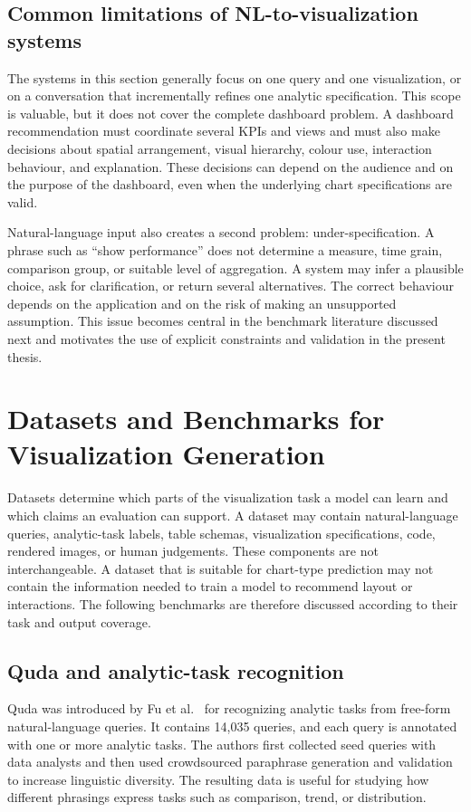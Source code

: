 \subsection{Common limitations of NL-to-visualization systems}

The systems in this section generally focus on one query and one visualization, or on a conversation that incrementally refines one analytic specification. This scope is valuable, but it does not cover the complete dashboard problem. A dashboard recommendation must coordinate several KPIs and views and must also make decisions about spatial arrangement, visual hierarchy, colour use, interaction behaviour, and explanation. These decisions can depend on the audience and on the purpose of the dashboard, even when the underlying chart specifications are valid.

Natural-language input also creates a second problem: under-specification. A phrase such as ``show performance'' does not determine a measure, time grain, comparison group, or suitable level of aggregation. A system may infer a plausible choice, ask for clarification, or return several alternatives. The correct behaviour depends on the application and on the risk of making an unsupported assumption. This issue becomes central in the benchmark literature discussed next and motivates the use of explicit constraints and validation in the present thesis.

\section{Datasets and Benchmarks for Visualization Generation}

Datasets determine which parts of the visualization task a model can learn and which claims an evaluation can support. A dataset may contain natural-language queries, analytic-task labels, table schemas, visualization specifications, code, rendered images, or human judgements. These components are not interchangeable. A dataset that is suitable for chart-type prediction may not contain the information needed to train a model to recommend layout or interactions. The following benchmarks are therefore discussed according to their task and output coverage.

\subsection{Quda and analytic-task recognition}

Quda was introduced by Fu et al.~\cite{fu2020quda} for recognizing analytic tasks from free-form natural-language queries. It contains 14,035 queries, and each query is annotated with one or more analytic tasks. The authors first collected seed queries with data analysts and then used crowdsourced paraphrase generation and validation to increase linguistic diversity. The resulting data is useful for studying how different phrasings express tasks such as comparison, trend, or distribution.

